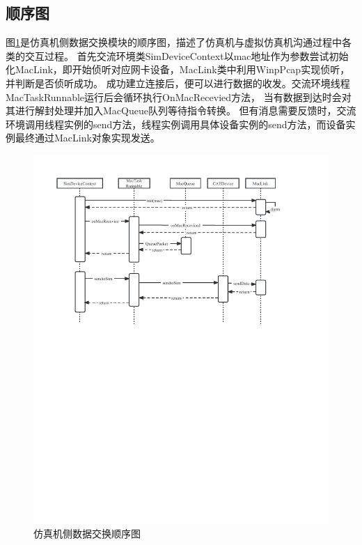 \subsection{顺序图}
图\ref{seq1}是仿真机侧数据交换模块的顺序图，描述了仿真机与虚拟仿真机沟通过程中各类的交互过程。
首先交流环境类SimDeviceContext以mac地址作为参数尝试初始化MacLink，即开始侦听对应网卡设备，MacLink类中利用WinpPcap实现侦听，并判断是否侦听成功。
成功建立连接后，便可以进行数据的收发。交流环境线程MacTaskRunnable运行后会循环执行OnMacRecevied方法，
当有数据到达时会对其进行解封处理并加入MacQueue队列等待指令转换。
但有消息需要反馈时，交流环境调用线程实例的send方法，线程实例调用具体设备实例的send方法，而设备实例最终通过MacLink对象实现发送。
\begin{figure}[h!]
    \begin{center}
        \includegraphics[width=\textwidth]{pictures/sequence1.pdf}
        \caption{仿真机侧数据交换顺序图}
        \label{seq1}
    \end{center}
\end{figure}
